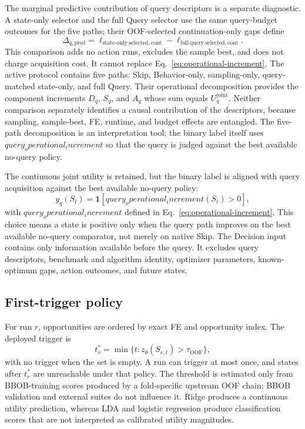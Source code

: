 The marginal predictive contribution of query descriptors is a separate
diagnostic.  A state-only selector and the full Query selector use the same
query-budget outcomes for the five paths; their OOF-selected continuation-only gaps
define
\begin{equation}
  \Delta_{q,\mathrm{pred}}
  =\ell_{\mathrm{state\mbox{-}only\ selected,cont}}
   -\ell_{\mathrm{full\ query\ selected,cont}}.
  \label{eq:query-feature-predictive-increment}
\end{equation}
This comparison adds no action runs, excludes the sample best, and does not
charge acquisition cost.  It cannot replace Eq.~\eqref{eq:operational-increment}.
The active protocol contains five paths: Skip, Behavior-only,
sampling-only, query-matched state-only, and full Query.  Their operational
decomposition provides the component increments $D_q$, $S_q$, and $A_q$ whose
sum equals $U_q^{\mathrm{joint}}$.  Neither comparison separately identifies
a causal contribution of the descriptors, because sampling, sample-best, FE,
runtime, and budget effects are entangled.  The five-path decomposition is
an interpretation tool; the binary label itself uses $query_operational_increment$ so that the
query is judged against the best available no-query policy.

The continuous joint utility is retained, but the binary label is aligned with
query acquisition against the best available no-query policy:
\begin{equation}
  y_q(S_t)=\mathbf{1}\!\left[query_operational_increment(S_t)>0\right],
  \label{eq:query-label}
\end{equation}
with \(query_operational_increment\) defined in Eq.~\eqref{eq:operational-increment}.  This choice means a state is positive only when the query path improves on the best available no-query comparator, not merely on native Skip.  The Decision input contains only information available before the query.  It excludes query descriptors, benchmark and algorithm identity, optimizer parameters, known-optimum gaps, action outcomes, and future states.

\subsection{First-trigger policy}

For run $r$, opportunities are ordered by exact FE and opportunity index.  The
deployed trigger is
\begin{equation}
  t_r^*=\min\{t:z_\theta(S_{r,t})>\tau_{\mathrm{OOF}}\},
  \label{eq:deployment-decision}
\end{equation}
with no trigger when the set is empty.  A run can trigger at most once, and
states after $t_r^*$ are unreachable under that policy.  The threshold is
estimated only from BBOB-training scores produced by a fold-specific upstream
OOF chain; BBOB validation and external suites do not influence it.  Ridge
produces a continuous utility prediction, whereas LDA and logistic regression
produce classification scores that are not interpreted as calibrated utility
magnitudes.

